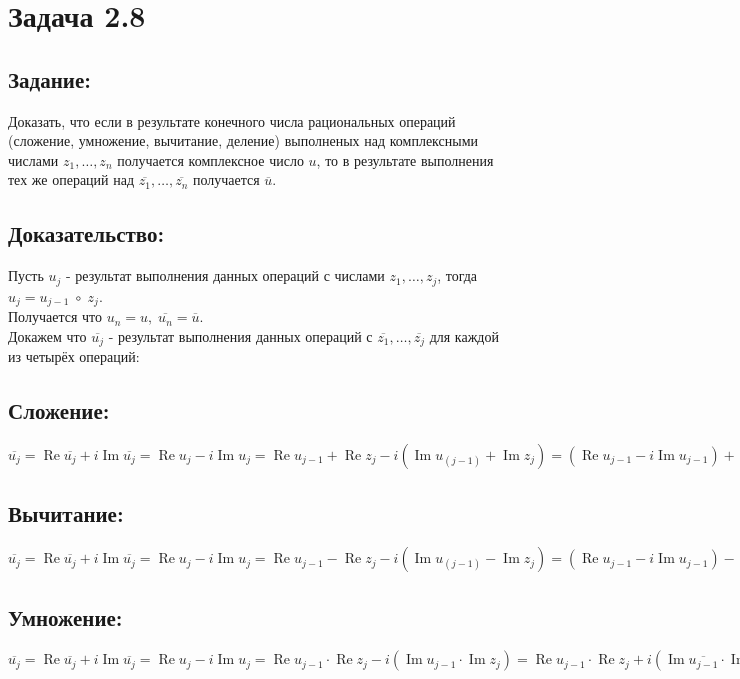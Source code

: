 \section{Задача 2.8}
\subsection{Задание:}
Доказать, что если в результате конечного числа рациональных операций (сложение, умножение, вычитание, деление)
выполненых над комплексными числами $ z_1, \dots, z_n $ получается комплексное число $ u $, то в результате выполнения тех же
операций над $ \overline{z_1}, \dots, \overline{z_n} $ получается $ \overline{u} $.
\subsection{Доказательство:}
Пусть $ u_j $ - результат выполнения данных операций с числами $ z_1, \dots, z_j $,
тогда $ u_j = u_{j-1} \; \circ \; z_j $.
\\
Получается что $ u_n = u, \; \overline{u_n} = \overline{u} $.
\\
Докажем что $ \overline{u_j} $ - результат выполнения данных операций с $ \overline{z_1}, \dots, \overline{z_j} $
для каждой из четырёх операций:
\subsection{Сложение:}
$
	\overline{u_j}
	=
	\operatorname{Re} \overline{u_j} + i \operatorname{Im} \overline{u_j}
	=
	\operatorname{Re} u_j - i \operatorname{Im} u_j
	=
	\operatorname{Re} u_{j-1} + \operatorname{Re} z_j - i(\operatorname{Im} u_(j-1) + \operatorname{Im} z_j)
	=
	(\operatorname{Re} u_{j-1} - i\operatorname{Im} u_{j-1}) + (\operatorname{Re} z_j - i\operatorname{Im} z_j)
	=
	\overline{u_{j-1}} + \overline{z_j}
$
\subsection{Вычитание:}
$
	\overline{u_j}
	=
	\operatorname{Re} \overline{u_j} + i \operatorname{Im} \overline{u_j}
	=
	\operatorname{Re} u_j - i \operatorname{Im} u_j
	=
	\operatorname{Re} u_{j-1} - \operatorname{Re} z_j - i(\operatorname{Im} u_(j-1) - \operatorname{Im} z_j)
	=
	(\operatorname{Re} u_{j-1} - i\operatorname{Im} u_{j-1}) - (\operatorname{Re} z_j - i\operatorname{Im} z_j)
	=
	\overline{u_{j-1}} - \overline{z_j}
$
\subsection{Умножение:}
$
	\overline{u_j}
	=
	\operatorname{Re} \overline{u_j} + i \operatorname{Im} \overline{u_j}
	=
	\operatorname{Re} u_j - i \operatorname{Im} u_j
	=
	\operatorname{Re} u_{j-1} \cdot \operatorname{Re} z_j - i(\operatorname{Im} u_{j-1} \cdot \operatorname{Im} z_j)
	=
	\operatorname{Re} u_{j-1} \cdot \operatorname{Re} z_j +
	i(\operatorname{Im} \overline{u_{j-1}} \cdot \operatorname{Im} \overline{z_j})
	=
	\overline{u_{j-1}} \cdot \overline{z_j}
$
